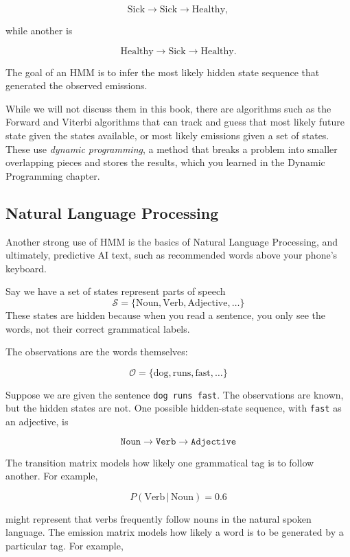 \[
    \text{Sick} \rightarrow \text{Sick} \rightarrow \text{Healthy},
\]

while another is

\[
    \text{Healthy} \rightarrow \text{Sick} \rightarrow \text{Healthy}.
\]

The goal of an HMM is to infer the most likely hidden state sequence that generated the observed emissions.

While we will not discuss them in this book, there are algorithms such as the Forward and Viterbi algorithms that can track and guess that most likely future state given the states available, or most likely emissions given a set of states. These use \emph{dynamic programming}, a method that breaks a problem into smaller overlapping pieces and stores the results, which you learned in the Dynamic Programming chapter.

\subsection{Natural Language Processing}
Another strong use of HMM is the basics of Natural Language Processing, and ultimately, predictive AI text, such as recommended words above your phone's keyboard.

Say we have a set of states represent parts of speech
$$\mathcal{S}=\{\text{Noun},\text{Verb},\text{Adjective}, \dots\}$$
These states are hidden because when you read a sentence, you only see the words, not their correct grammatical labels.

The observations are the words themselves:

$$\mathcal{O}=\{\text{dog},\text{runs},\text{fast},\dots \}$$

Suppose we are given the sentence \texttt{dog runs fast}. The observations are known, but the hidden states are not. One possible hidden-state sequence, with \texttt{fast} as an adjective, is

$$\texttt{Noun}\rightarrow \texttt{Verb}\rightarrow \texttt{Adjective}$$

The transition matrix models how likely one grammatical tag is to follow another. For example,

$$P(\text{Verb} \,| \,\text{Noun})=0.6$$

might represent that verbs frequently follow nouns in the natural spoken language. The emission matrix models how likely a word is to be generated by a particular tag. For example,

